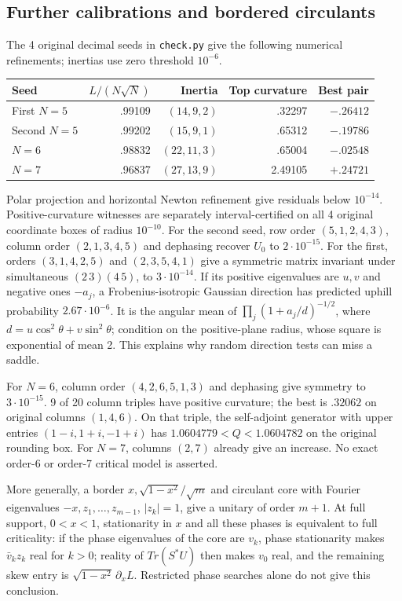 \documentclass[11pt,a4paper]{article}
\begin{document}
\subsection{Further calibrations and bordered circulants}
The 4 original decimal seeds in \texttt{check.py} give the following
numerical refinements; inertias use zero threshold $10^{-6}$.
\begin{center}
\begin{tabular}{lrrrr}
\toprule
Seed & $L/(N\sqrt N)$ & Inertia & Top curvature & Best pair\\
\midrule
First $N=5$ & .99109 & $(14,9,2)$ & .32297 & $-.26412$\\
Second $N=5$ & .99202 & $(15,9,1)$ & .65312 & $-.19786$\\
$N=6$ & .98832 & $(22,11,3)$ & .65004 & $-.02548$\\
$N=7$ & .96837 & $(27,13,9)$ & 2.49105 & $+.24721$\\
\bottomrule
\end{tabular}
\end{center}
Polar projection and horizontal Newton refinement give residuals below
$10^{-14}$. Positive-curvature witnesses are separately interval-certified
on all 4 original coordinate boxes of radius $10^{-10}$.
For the second seed, row order $(5,1,2,4,3)$, column order $(2,1,3,4,5)$
and dephasing recover $U_0$ to $2\cdot10^{-15}$.
For the first, orders $(3,1,4,2,5)$ and $(2,3,5,4,1)$ give a symmetric
matrix invariant under simultaneous $(2\,3)(4\,5)$, to $3\cdot10^{-14}$.
If its positive eigenvalues are $u,v$ and negative ones $-a_j$, a
Frobenius-isotropic Gaussian direction has predicted uphill probability
$2.67\cdot10^{-6}$. It is the angular mean of
$\prod_j(1+a_j/d)^{-1/2}$, where $d=u\cos^2\theta+v\sin^2\theta$;
condition on the positive-plane radius, whose square is exponential of
mean 2. This explains why random direction tests can miss a saddle.

For $N=6$, column order $(4,2,6,5,1,3)$ and dephasing give symmetry to
$3\cdot10^{-15}$. 9 of 20 column triples have positive curvature;
the best is $.32062$ on original columns $(1,4,6)$. On that triple,
the self-adjoint generator with upper entries $(1-i,1+i,-1+i)$ has
$1.0604779<Q<1.0604782$ on the original rounding box.
For $N=7$, columns $(2,7)$ already give an increase. No exact
order-6 or order-7 critical model is asserted.

More generally, a border $x,\sqrt{1-x^2}/\sqrt m$ and circulant core
with Fourier eigenvalues $-x,z_1,\ldots,z_{m-1}$, $|z_k|=1$, give a
unitary of order $m+1$. At full support, $0<x<1$, stationarity in $x$
and all these phases is equivalent to full criticality: if the
phase eigenvalues of the core are $v_k$, phase stationarity makes
$\bar v_kz_k$ real for $k>0$; reality of $Tr(S^*U)$ then makes $v_0$
real, and the remaining skew entry is $\sqrt{1-x^2}\,\partial_x L$.
Restricted phase searches alone do not give this conclusion.
\end{document}
